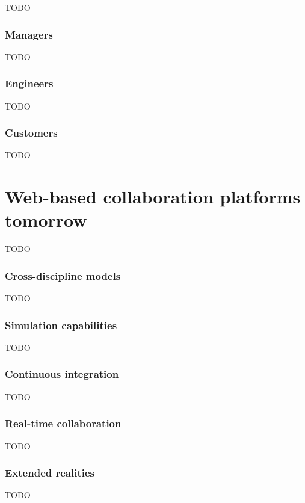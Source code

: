 \documentclass[numbers,sort&compress]{IntechOpen-Book}%
\begin{document}
TODO

\subsubsection*{Managers}

TODO

\subsubsection*{Engineers}

TODO

\subsubsection*{Customers}

TODO

\section{Web-based collaboration platforms tomorrow}

TODO

\subsubsection*{Cross-discipline models}

TODO

\subsubsection*{Simulation capabilities}

TODO

\subsubsection*{Continuous integration}

TODO

\subsubsection*{Real-time collaboration}

TODO

\subsubsection*{Extended realities}

TODO
\end{document}
